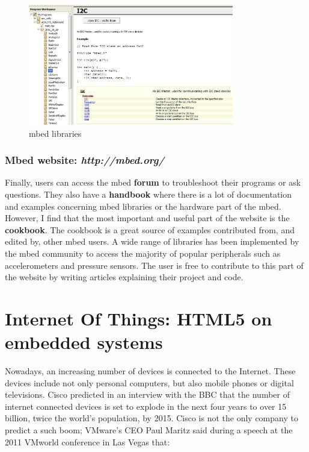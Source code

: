 \documentclass[pdftex,10pt,a4paper]{report}
\begin{document}
\begin{figure}[h!]
\centering
\includegraphics[width=0.8\textwidth]{./libraries.jpg}
\caption{mbed libraries}
\label{mbed libraries}
\end{figure}


\subsection{Mbed website: \textit{http://mbed.org/}}
Finally, users can access the mbed \textbf{forum} to troubleshoot their programs or ask questions. They also have a \textbf{handbook} where there is a lot of documentation and examples concerning mbed libraries or the hardware part of the mbed. However, I find that the most important and useful part of the website is the \textbf{cookbook}. The cookbook is a great source of examples contributed from, and edited by, other mbed users. A wide range of libraries has been implemented by the mbed community to access the majority of popular peripherals such as accelerometers and pressure sensors. The user is free to contribute to this part of the website by writing articles explaining their project and code. 

\chapter{Internet Of Things: HTML5 on embedded systems}
Nowadays, an increasing number of devices is connected to the Internet. These devices include not only personal computers, but also mobile phones or digital televisions.
Cisco predicted in an interview with the BBC that the number of internet connected devices is set to explode in the next four years to over 15 billion, twice the world's population, by 2015. Cisco is not the only company to predict a such boom; VMware's CEO Paul Maritz said during a speech at the 2011 VMworld conference in Las Vegas that:
\end{document}
